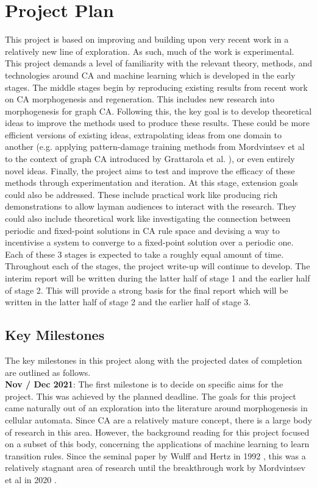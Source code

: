 \chapter{Project Plan}

This project is based on improving and building upon very recent work in a relatively new line of exploration.
As such, much of the work is experimental.
This project demands a level of familiarity with the relevant theory, methods, and technologies around CA and machine learning which is developed in the early stages.
The middle stages begin by reproducing existing results from recent work on CA morphogenesis and regeneration. This includes new research into morphogenesis for graph CA. 
Following this, the key goal is to develop theoretical ideas to improve the methods used to produce these results. These could be more efficient versions of existing ideas, extrapolating ideas from one domain to another (e.g. applying pattern-damage training methods from Mordvintsev et al \cite{mordvintsev2020growing} to the context of graph CA introduced by Grattarola et al. \cite{grattarola2021learning}), or even entirely novel ideas.
Finally, the project aims to test and improve the efficacy of these methods through experimentation and iteration. 
At this stage, extension goals could also be addressed. 
These include practical work like producing rich demonstrations to allow layman audiences to interact with the research. 
They could also include theoretical work like investigating the connection between periodic and fixed-point solutions in CA rule space and devising a way to incentivise a system to converge to a fixed-point solution over a periodic one.
Each of these 3 stages is expected to take a roughly equal amount of time.
Throughout each of the stages, the project write-up will continue to develop.
The interim report will be written during the latter half of stage 1 and the earlier half of stage 2.
This will provide a strong basis for the final report which will be written in the latter half of stage 2 and the earlier half of stage 3.

\section{Key Milestones}
The key milestones in this project along with the projected dates of completion are outlined as follows.\\

\textbf{Nov / Dec 2021}: The first milestone is to decide on specific aims for the project. 
This was achieved by the planned deadline. 
The goals for this project came naturally out of an exploration into the literature around morphogenesis in cellular automata.
Since CA are a relatively mature concept, there is a large body of research in this area.
However, the background reading for this project focused on a subset of this body, concerning the applications of machine learning to learn transition rules.
Since the seminal paper by Wulff and Hertz in 1992 \cite{wulff1992learning}, this was a relatively stagnant area of research until the breakthrough work by Mordvintsev et al in 2020 \cite{mordvintsev2020growing}.

